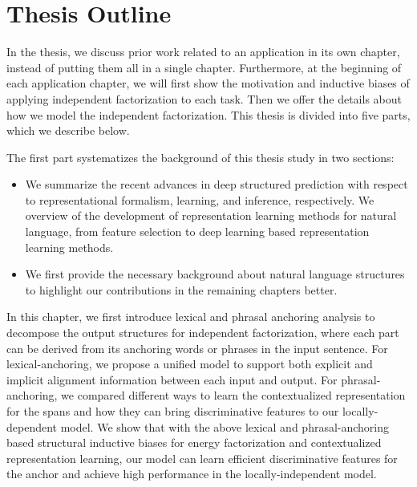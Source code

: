 
\section{Thesis Outline}
\label{sec:intro:roadmap}

In the thesis, we discuss prior work related to an application in its
own chapter, instead of putting them all in a single
chapter. Furthermore, at the beginning of each application chapter, we
will first show the motivation and inductive biases of applying
independent factorization to each task. Then we offer the details about
how we model the independent factorization. This thesis is divided
into five parts, which we describe below.

 The first part systematizes the
background of this thesis study in two sections:
\begin{itemize}
\item {} We summarize
  the recent advances in deep structured prediction with respect to
  representational formalism, learning, and inference, respectively. We
  overview of the development of representation learning methods for
  natural language, from feature selection to deep learning based
  representation learning methods.

\item {} We first provide the necessary
  background about natural language structures to highlight our contributions in the remaining chapters better.
\end{itemize}

 In this chapter, we first introduce lexical and
phrasal anchoring analysis to decompose the output structures for
independent factorization, where each part can be derived from its
anchoring words or phrases in the input sentence. For
lexical-anchoring, we propose a unified model to support both explicit
and implicit alignment information between each input and output. For
phrasal-anchoring, we compared different ways to learn the
contextualized representation for the spans and how they can bring
discriminative features to our locally-dependent model. We show that
with the above lexical and phrasal-anchoring based structural
inductive biases for energy factorization and contextualized
representation learning, our model can learn efficient discriminative
features for the anchor and achieve high performance in the
locally-independent model.

